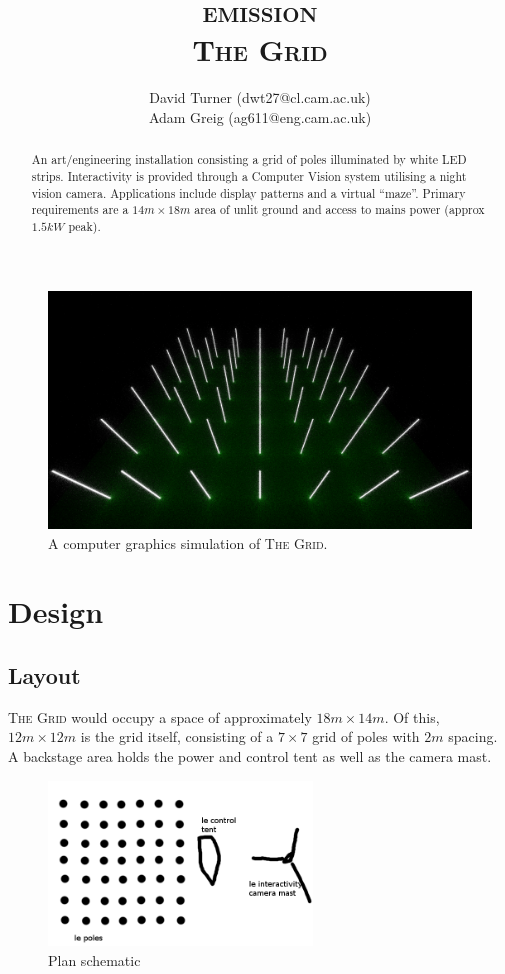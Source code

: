 \documentclass[12pt]{article} %
\title {\textsc{emission}\\\large{\textsc{The Grid}}}
\author{David Turner (dwt27@cl.cam.ac.uk)\\Adam Greig (ag611@eng.cam.ac.uk)}
\date{} %
\begin{document}
    \maketitle

\begin{abstract}
An art/engineering installation consisting a grid of poles illuminated by white LED strips.  Interactivity is provided through a Computer Vision system utilising a night vision camera.  Applications include display patterns and a virtual ``maze''.  Primary requirements are a $14m \times 18m$ area of unlit ground and access to mains power (approx $1.5kW$ peak).
\end{abstract}

\begin{figure}[h]
    \centering
    \includegraphics[width=\textwidth]{pics/render1.png}
    \caption{A computer graphics simulation of \textsc{The Grid}.}
\end{figure}

\clearpage
\section{Design}
\subsection{Layout}
\textsc{The Grid} would occupy a space of approximately $18m \times 14m$.  Of this, $12m \times 12m$ is the grid itself, consisting of a $7 \times 7$ grid of poles with $2m$ spacing.  A backstage area holds the power and control tent as well as the camera mast.

\begin{figure}[h]
    \centering
    \includegraphics[width=7cm]{diags/plan.png}
    \caption{Plan schematic}
    \label{fig:planschematic}
\end{figure}
\end{document}
